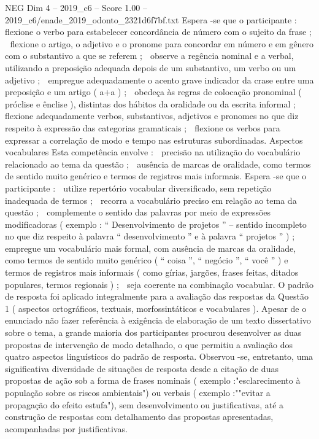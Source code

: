 \begin{textsample}{NEG Dim 4 – 2019\_c6 – Score 1.00 – 2019\_c6/enade\_2019\_odonto\_2321d6f7bf.txt}
Espera -se que o participante :  flexione o verbo para estabelecer concordância de número com o sujeito da frase ;  flexione o artigo, o adjetivo e o pronome para concordar em número e em gênero com o substantivo a que se referem ;  observe a regência nominal e a verbal, utilizando a preposição adequada depois de um substantivo, um verbo ou um adjetivo ;  empregue adequadamente o acento grave indicador da crase entre uma preposição e um artigo ( a+a ) ;  obedeça às regras de colocação pronominal ( próclise e ênclise ), distintas dos hábitos da oralidade ou da escrita informal ;  flexione adequadamente verbos, substantivos, adjetivos e pronomes no que diz respeito à expressão das categorias gramaticais ;  flexione os verbos para expressar a correlação de modo e tempo nas estruturas subordinadas.
Aspectos vocabulares Esta competência envolve :  precisão na utilização do vocabulário relacionado ao tema da questão ;  ausência de marcas de oralidade, como termos de sentido muito genérico e termos de registros mais informais.
Espera -se que o participante :  utilize repertório vocabular diversificado, sem repetição inadequada de termos ;  recorra a vocabulário preciso em relação ao tema da questão ;  complemente o sentido das palavras por meio de expressões modificadoras ( exemplo : “ Desenvolvimento de projetos ” – sentido incompleto no que diz respeito à palavra “ desenvolvimento ” e à palavra “ projetos ” ) ;  empregue um vocabulário mais formal, com ausência de marcas da oralidade, como termos de sentido muito genérico ( “ coisa ”, “ negócio ”, “ você ” ) e termos de registros mais informais ( como gírias, jargões, frases feitas, ditados populares, termos regionais ) ;  seja coerente na combinação vocabular.
O padrão de resposta foi aplicado integralmente para a avaliação das respostas da Questão 1 ( aspectos ortográficos, textuais, morfossintáticos e vocabulares ).
Apesar de o enunciado não fazer referência à exigência de elaboração de um texto dissertativo sobre o tema, a grande maioria dos participantes procurou desenvolver as duas propostas de intervenção de modo detalhado, o que permitiu a avaliação dos quatro aspectos linguísticos do padrão de resposta.
Observou -se, entretanto, uma significativa diversidade de situações de resposta desde a citação de duas propostas de ação sob a forma de frases nominais ( exemplo :"esclarecimento à população sobre os riscos ambientais") ou verbais ( exemplo :""evitar a propagação do efeito estufa"), sem desenvolvimento ou justificativas, até a construção de respostas com detalhamento das propostas apresentadas, acompanhadas por justificativas.

\end{textsample}
